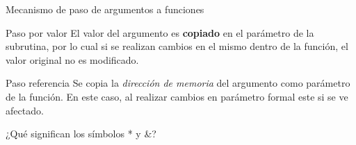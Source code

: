 \documentclass[xcolor=pdftex,table,11pt]{beamer}
\begin{document}
\begin{frame}[allowframebreaks]{Mecanismo de paso de argumentos a funciones}

\begin{block}{Paso por valor}
El valor del argumento es \textbf{copiado} en el parámetro de la subrutina, por lo cual si se realizan cambios en el mismo dentro de la función, el valor original no es modificado.

\end{block}

\codesetstylefrombeamer




\begin{block}{Paso referencia}
Se copia la \textit{dirección de memoria} del argumento como parámetro de la función. En este caso, al realizar cambios en parámetro formal este si se ve afectado.
\end{block}
\codesetstylefrombeamer
{}


¿Qué significan los símbolos * y \&?


\end{frame}
\end{document}
